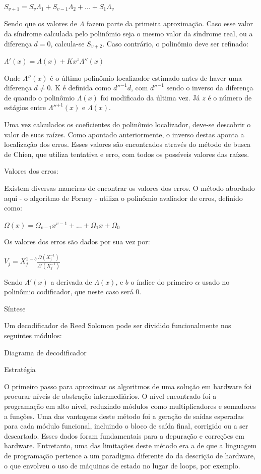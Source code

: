 	$S_{v + 1} = S_{v}\Lambda_{1} + S_{v-1}\Lambda_{2} + ... + S_{1}\Lambda_{v}$
	
	
	Sendo que os valores de $\Lambda$ fazem parte da primeira aproximação. Caso esse valor da síndrome calculada pelo polinômio seja o mesmo valor da síndrome real, ou a diferença $d = 0$, calcula-se $S_{v + 2}$. Caso contrário, o polinômio deve ser refinado:
	
	$\Lambda'(x) = \Lambda(x) +  Kx^{z}\Lambda''(x)$
	
	
	Onde $\Lambda''(x)$ é o último polinômio localizador estimado antes de haver uma diferença $d \neq 0$. K é definida como $d''^{-1}d$, com $d''^{-1}$ sendo o inverso da diferença de quando o polinômio $\Lambda(x)$ foi modificado da última vez. Já $z$ é o número de estágios entre $\Lambda''^{+1}(x)$ e $\Lambda(x)$.
	
	Uma vez calculados os coeficientes do polinômio localizador, 
	deve-se descobrir o valor de suas raízes. Como apontado anteriormente, o inverso destas aponta a localização dos erros. Esses valores são encontrados através do método de busca de Chien, que utiliza tentativa e erro, com todos os possíveis valores das raízes.
	
	Valores dos erros:
	
	Existem diversas maneiras de encontrar os valores dos erros. O método abordado aqui - o algoritmo de Forney - utiliza o polinômio avaliador de erros, definido como:
	
	$\Omega(x) = \Omega_{v-1}x^{v-1} + ... + \Omega_{1}x + \Omega_{0}$
	
	
	Os valores dos erros são dados por sua vez por:
	
	$V_{j} = X_{j}^{1-b} \frac{\Omega(X_{j}^{-1})}{\Lambda'(X_{j}^{-1})}$
	
	
	Sendo $\Lambda'(x)$ a derivada de $\Lambda(x)$, e $b$ o índice do primeiro $\alpha$ usado no polinômio codificador, que neste caso será 0.
	
	Síntese
	
	Um decodificador de Reed Solomon pode ser dividido funcionalmente nos seguintes módulos:
	
	Diagrama de decodificador
	
	
	Estratégia
	
	O primeiro passo para aproximar os algoritmos de uma solução em hardware foi procurar níveis de abstração intermediários. O nível encontrado foi a programação em alto nível, reduzindo módulos como multiplicadores e somadores a funções. Uma das vantagens deste método foi a geração de saídas esperadas para cada módulo funcional, incluindo o bloco de saída final, corrigido ou a ser descartado. Esses dados foram fundamentais para a depuração e correções em hardware. Entretanto, uma das limitações deste método era a de que a linguagem de programação pertence a um paradigma diferente do da descrição de hardware, o que envolveu o uso de máquinas de estado no lugar de loops, por exemplo.  
	
